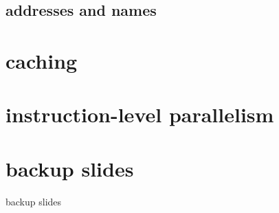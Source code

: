 

\subsection{addresses and names}



\section{caching}




\section{instruction-level parallelism}




\section{backup slides}
\begin{frame}{backup slides}
\end{frame}


